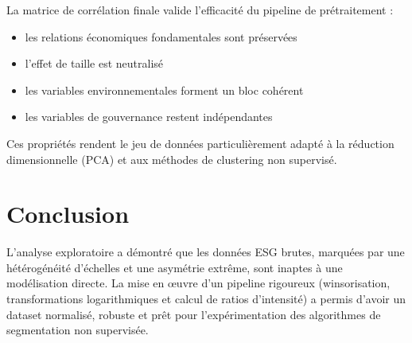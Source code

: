 La matrice de corrélation finale valide l’efficacité du pipeline de prétraitement :

\begin{itemize}
    \item les relations économiques fondamentales sont préservées
    \item l’effet de taille est neutralisé
    \item les variables environnementales forment un bloc cohérent
    \item les variables de gouvernance restent indépendantes
\end{itemize}

Ces propriétés rendent le jeu de données particulièrement adapté à la réduction dimensionnelle (PCA) et aux méthodes de clustering non supervisé.

\section*{Conclusion}

L’analyse exploratoire a démontré que les données ESG brutes, marquées par une hétérogénéité d’échelles et une asymétrie extrême, sont inaptes à une modélisation directe. La mise en œuvre d'un pipeline rigoureux (winsorisation, transformations logarithmiques et calcul de ratios d'intensité) a permis d'avoir un dataset normalisé, robuste et prêt pour l'expérimentation des algorithmes de segmentation non supervisée.